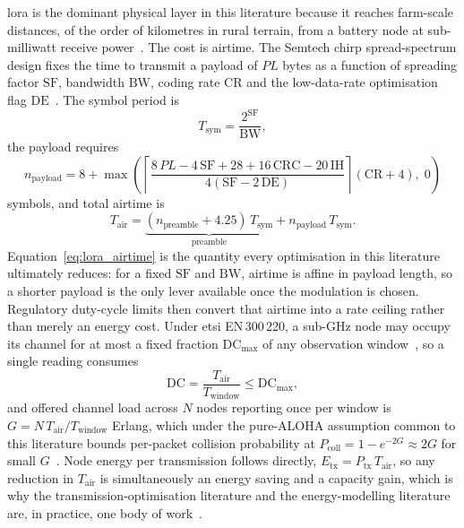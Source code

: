 \documentclass[12pt,a4paper,oneside]{book}
\begin{document}
\gls{lora} is the dominant physical layer in this literature because it
reaches farm-scale distances, of the order of kilometres in rural terrain,
from a battery node at sub-milliwatt receive
power~\cite{raza2018lorawan, li2020performance, raj2017comprehensive}. The
cost is airtime. The Semtech chirp spread-spectrum design fixes the time to
transmit a payload of $PL$ bytes as a function of spreading factor $\mathrm{SF}$,
bandwidth $\mathrm{BW}$, coding rate $\mathrm{CR}$ and the low-data-rate
optimisation flag $\mathrm{DE}$~\cite{semtech2015lorawan, bor2016lorawan}.
The symbol period is
\begin{equation}
T_{\text{sym}} = \frac{2^{\mathrm{SF}}}{\mathrm{BW}},
\label{eq:lora_symbol}
\end{equation}
the payload requires
\begin{equation}
n_{\text{payload}} = 8 + \max\!\left(
  \left\lceil \frac{8\,PL - 4\,\mathrm{SF} + 28 + 16\,\mathrm{CRC} - 20\,\mathrm{IH}}
                    {4(\mathrm{SF} - 2\,\mathrm{DE})} \right\rceil
  (\mathrm{CR}+4),\; 0 \right)
\label{eq:lora_payload_symbols}
\end{equation}
symbols, and total airtime is
\begin{equation}
T_{\text{air}} = \underbrace{(n_{\text{preamble}} + 4.25)\, T_{\text{sym}}}_{\text{preamble}}
               + n_{\text{payload}} \, T_{\text{sym}}.
\label{eq:lora_airtime}
\end{equation}
Equation~\ref{eq:lora_airtime} is the quantity every optimisation in this
literature ultimately reduces: for a fixed $\mathrm{SF}$ and $\mathrm{BW}$,
airtime is affine in payload length, so a shorter payload is the only lever
available once the modulation is chosen. Regulatory duty-cycle limits then
convert that airtime into a rate ceiling rather than merely an energy cost.
Under \gls{etsi} EN\,300\,220, a sub-GHz node may occupy its channel for at
most a fixed fraction $\mathrm{DC}_{\max}$ of any observation
window~\cite{ttn2024eu868, loraalliance2021regional}, so a single reading
consumes
\begin{equation}
\mathrm{DC} = \frac{T_{\text{air}}}{T_{\text{window}}} \leq \mathrm{DC}_{\max},
\label{eq:duty_cycle}
\end{equation}
and offered channel load across $N$ nodes reporting once per window is
$G = N\,T_{\text{air}}/T_{\text{window}}$ Erlang, which under the pure-ALOHA
assumption common to this literature bounds per-packet collision probability
at $P_{\text{coll}} = 1 - e^{-2G} \approx 2G$ for small
$G$~\cite{bor2016lorawan, adelantado2017understanding}. Node energy per
transmission follows directly, $E_{\text{tx}} = P_{\text{tx}}\,T_{\text{air}}$,
so any reduction in $T_{\text{air}}$ is simultaneously an energy saving and a
capacity gain, which is why the transmission-optimisation literature and the
energy-modelling literature are, in practice, one
body of work~\cite{barr1994energy, polastre2005versatile, gonzalez2000energy, mohammed2025loraEnergy, sanchez2021energy, heinzelman2000energy}.
\end{document}

